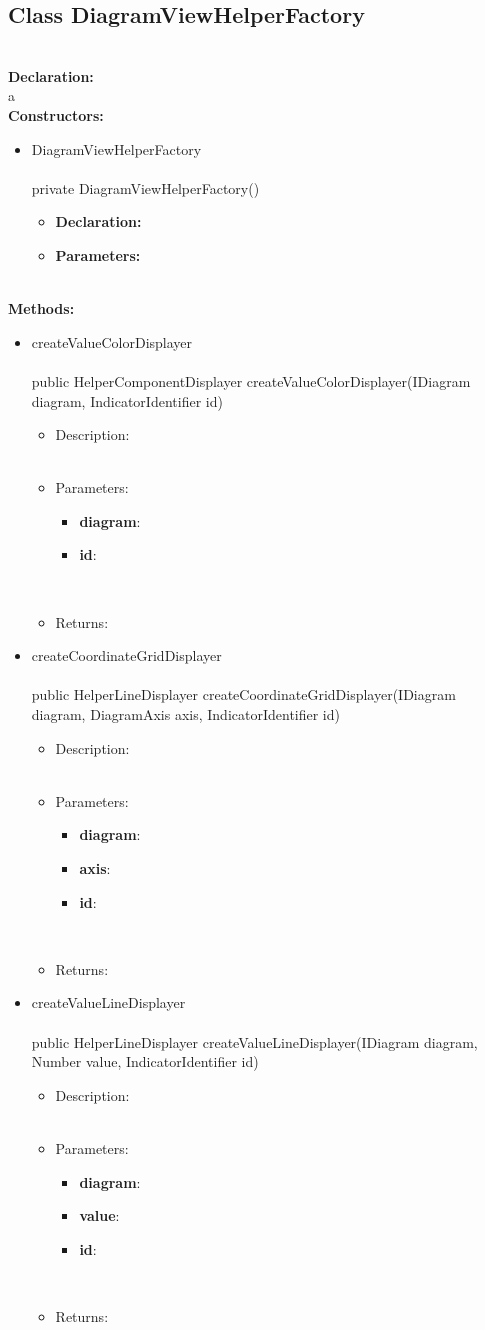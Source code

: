 \documentclass[10pt,a4paper]{report}
\newcommand{\public}{\textcolor{col:public}{public }}
\newcommand{\private}{\textcolor{col:private}{private }}
\newcommand{\type}[1]{\textcolor{col:class}{#1}}
\newcommand{\methoddesc}[8]{
#4
\leavevmode \\
\leavevmode \\
#1#2\type{#3} #4(#5)
\begin{itemize}[label=-]
    \item Description: \leavevmode \\ #6 \leavevmode \\
    \item Parameters: \leavevmode \\ #7 \leavevmode \\
    \item Returns: \leavevmode \\ #8
\end{itemize}
}
\newcommand{\paramdesc}[2]{
    \textbf{#1}: #2
}
\newcommand{\constrdesc}[5]{
#2
\leavevmode \\
\leavevmode \\
#1#2(#3) \leavevmode \\
\begin{itemize}[label=-]
    \item \textbf{Declaration:} \leavevmode \\ #4
    \item \textbf{Parameters:} \leavevmode \\ #5
\end{itemize}
}
\newcommand{\desc}[3]{
    #1{#2 #3}
}
\newcommand{\classdesc}[4]{
    \desc{\subsection}{Class}{#1} \leavevmode \\
    \textbf{Declaration:} \leavevmode \\
    #2 \leavevmode \\
    \textbf{Constructors:} \leavevmode \\
    #3 \leavevmode \\
    \textbf{Methods:} \leavevmode \\
    #4
}
\begin{document}
\classdesc{DiagramViewHelperFactory}{a}{
    \begin{itemize}
        \item \constrdesc{\private}{DiagramViewHelperFactory}{}{}{}
    \end{itemize}
}{
    \begin{itemize}
        \item \methoddesc{\public}{}{HelperComponentDisplayer}{createValueColorDisplayer}{\type{IDiagram} diagram, \type{IndicatorIdentifier} id}
        {}{
            \begin{itemize}
                \item \paramdesc{diagram}{}
                \item \paramdesc{id}{}
            \end{itemize}
        }{}
        \item \methoddesc{\public}{}{HelperLineDisplayer}{createCoordinateGridDisplayer}{\type{IDiagram} diagram, \type{DiagramAxis} axis, \type{IndicatorIdentifier} id}
        {}{
            \begin{itemize}
                \item \paramdesc{diagram}{}
                \item \paramdesc{axis}{}
                \item \paramdesc{id}{}
            \end{itemize}
        }{}
        \item \methoddesc{\public}{}{HelperLineDisplayer}{createValueLineDisplayer}{\type{IDiagram} diagram, \type{Number} value, \type{IndicatorIdentifier} id}
        {}{
            \begin{itemize}
                \item \paramdesc{diagram}{}
                \item \paramdesc{value}{}
                \item \paramdesc{id}{}
            \end{itemize}
        }{}
    \end{itemize}
}
\end{document}
